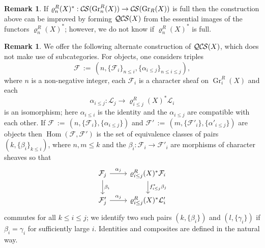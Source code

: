 \documentclass[10pt]{amsart}
\theoremstyle{plain}
\theoremstyle{definition}
\newtheorem{remark}[theorem]{Remark}
\DeclareMathOperator{\Hom}{Hom}
\DeclareMathOperator{\Gr}{Gr}
\newcommand{\ceq}{{\, :=\, }}
\newcommand{\cs}[1]{{\mathcal{#1}}}
\newcommand{\CS}{{\mathcal{C\hskip-0.8pt S}}}
\newcommand{\QCS}{{\mathcal{QC\hskip-0.8pt S}}}
\begin{document}
\begin{remark}
If $\varrho^R_n(X)^* : \CS(\Gr^R_n(X)) \to \CS(\Gr_R(X))$ is full then the construction above can be improved by forming $\QCS(X)$ from the essential images of the functors $\varrho^R_n(X)^*$; however, we do not know if $\varrho^R_n(X)^*$ is full.
\end{remark}

\begin{remark}
We offer the following alternate construction of $\QCS(X)$, which does not make use of subcategories.
For objects, one considers triples 
\[
\cs{F} \ceq (n, \{\cs{F}_i\}_{n\leq i}, \{\alpha_{i \le j}\}_{n\le i \le j}),
\] where $n$
is a non-negative integer, each $\cs{F}_i$ is a character sheaf on $\Gr^R_i(X)$ and each 
\[
\alpha_{i \le j} : \cs{L}_j \to \varrho^R_{i \le j}(X)^* \cs{L}_i
\]
 is an isomorphism; here $\alpha_{i \le i}$ is the identity and the $\alpha_{i \le j}$ are compatible with each other.  
If $\cs{F} \ceq (n, \{\cs{F}_i\}, \{\alpha_{i \le j}\})$
and $\cs{F}' \ceq (m, \{\cs{F}'_i\}, \{\alpha'_{i \le j}\})$ are objects then $\Hom(\cs{F}, \cs{F}')$ is the set
of equivalence classes of pairs $(k, \{\beta_i\}_{k \le i})$, where $n,m \le k$ and the $\beta_i : \cs{F}_i \to \cs{F}'_i$ are
morphisms of character sheaves so that
\[
\begin{tikzcd}
\cs{F}_j \rar{\alpha_j} \dar{\beta_i} & \varrho^R_{i \le j}(X)^* \cs{F}_i \dar{f_{i \le j}^*\beta_j} \\
\cs{F}'_j \rar{\alpha_j} & \varrho^R_{i \le j}(X)^* \cs{L}'_i
\end{tikzcd}
\]
commutes for all $k\le i\le j$; we identify two such pairs $(k, \{\beta_i\})$ and $(l, \{\gamma_i\})$ if $\beta_i = \gamma_i$
for sufficiently large $i$.  Identities and composites are defined in the natural way.
\end{remark}
\end{document}
